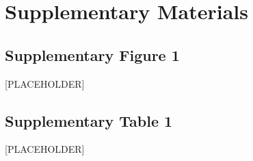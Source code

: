 \documentclass[12pt]{article}
\begin{document}
\section*{Supplementary Materials}

\subsection*{Supplementary Figure 1}

[PLACEHOLDER]

\subsection*{Supplementary Table 1}

[PLACEHOLDER]

\end{document}
